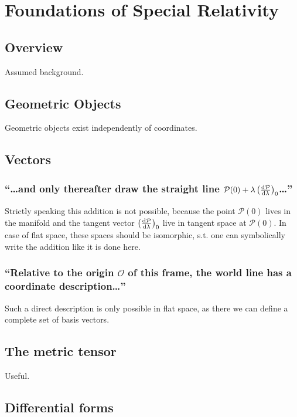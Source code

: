 \section{Foundations of Special Relativity}\label{sec:chapter2}


\subsection{Overview}\label{susec:2_1}
Assumed background.

\subsection{Geometric Objects}\label{susec:2_2}
Geometric objects exist independently of coordinates.

\subsection{Vectors}\label{susec:2_3}
\subsubsection{\enquote{\dots and only thereafter draw the straight line $\mathcal{P}(0)+\lambda\left(\derivative{\mathcal{P}}{\lambda}\right)_0$\dots} }\label{sususec:2_3_p49_1}

Strictly speaking this addition is not possible, because the point $\mathcal{P}(0)$ lives in the manifold and the tangent vector $\left(\derivative{\mathcal{P}}{\lambda}\right)_0$ live in tangent space at $\mathcal{P}(0)$. In case of flat space, these spaces should be isomorphic, s.t. one can symbolically write the addition like it is done here.

\subsubsection{\enquote{Relative to the origin $\mathcal{O}$ of this frame, the world line has a coordinate description\dots} }\label{sususec:2_3_p50_1}
Such a direct description is only possible in flat space, as there we can define a complete set of basis vectors.
\subsection{The metric tensor}\label{susec:2_4}
Useful.
\subsection{Differential forms}\label{susec:2_5}

